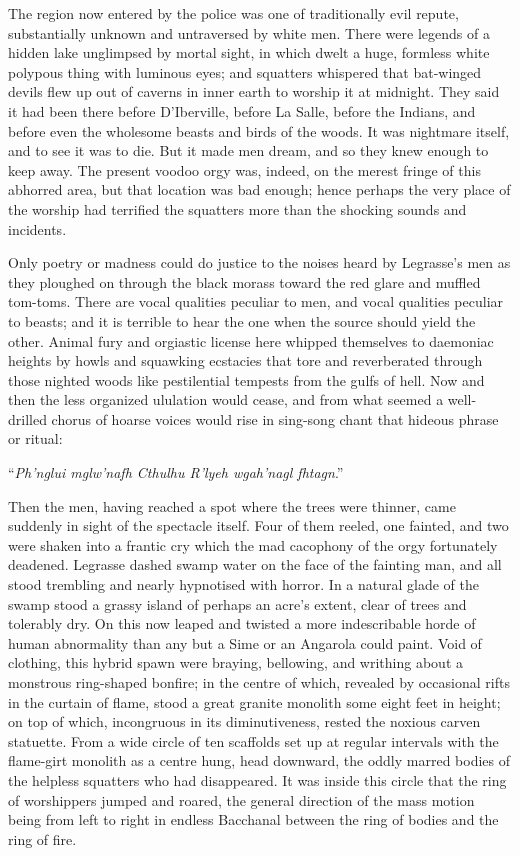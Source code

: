 \begin{pages}
\begin{Leftside}
The region now entered by the police was one of traditionally evil
repute, substantially unknown and untraversed by white men. There were
legends of a hidden lake unglimpsed by mortal sight, in which dwelt a
huge, formless white polypous thing with luminous eyes; and squatters
whispered that bat-winged devils flew up out of caverns in inner earth
to worship it at midnight. They said it had been there before
D'Iberville, before La Salle, before the Indians, and before even the
wholesome beasts and birds of the woods. It was nightmare itself, and to
see it was to die. But it made men dream, and so they knew enough to
keep away. The present voodoo orgy was, indeed, on the merest fringe of
this abhorred area, but that location was bad enough; hence perhaps the very place  of the worship had terrified the squatters more than the
shocking sounds and incidents.

Only poetry or madness could do justice to the noises heard by
Legrasse's men as they ploughed on through the black morass toward the
red glare and muffled tom-toms. There are vocal qualities peculiar to
men, and vocal qualities peculiar to beasts; and it is terrible to hear
the one when the source should yield the other. Animal fury and
orgiastic license here whipped themselves to daemoniac heights by howls
and squawking ecstacies that tore and reverberated through those nighted
woods like pestilential tempests from the gulfs of hell. Now and then
the less organized ululation would cease, and from what seemed a
well-drilled chorus of hoarse voices would rise in sing-song chant that
hideous phrase or ritual:

``\emph{Ph'nglui mglw'nafh Cthulhu R'lyeh wgah'nagl fhtagn}.''

Then the men, having reached a spot where the trees were thinner, came
suddenly in sight of the spectacle itself. Four of them reeled, one
fainted, and two were shaken into a frantic cry which the mad cacophony
of the orgy fortunately deadened. Legrasse dashed swamp water on the
face of the fainting man, and all stood trembling and nearly hypnotised
with horror.
In a natural glade of the swamp stood a grassy island of perhaps an
acre's extent, clear of trees and tolerably dry. On this now leaped and
twisted a more indescribable horde of human abnormality than any but a
Sime or an Angarola could paint. Void of clothing, this hybrid spawn
were braying, bellowing, and writhing about a monstrous ring-shaped
bonfire; in the centre of which, revealed by occasional rifts in the
curtain of flame, stood a great granite monolith some eight feet in
height; on top of which, incongruous in its diminutiveness, rested the
noxious carven statuette. From a wide circle of ten scaffolds set up at
regular intervals with the flame-girt monolith as a centre hung, head
downward, the oddly marred bodies of the helpless squatters who had
disappeared. It was inside this circle that the ring of worshippers
jumped and roared, the general direction of the mass motion being from
left to right in endless Bacchanal between the ring of bodies and the
ring of fire.


\end{Leftside}
\end{pages}
